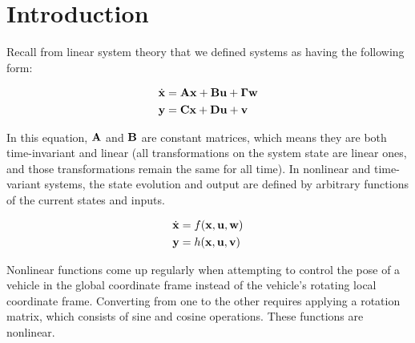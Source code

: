 \section{Introduction}

Recall from linear \gls{system} theory that we defined \glspl{system} as having
the following form:

\begin{align*}
  \dot{\mathbf{x}} &= \mathbf{A}\mathbf{x} + \mathbf{B}\mathbf{u} + \mathbf{\Gamma}\mathbf{w} \\
  \mathbf{y} &= \mathbf{C}\mathbf{x} + \mathbf{D}\mathbf{u} + \mathbf{v}
\end{align*}

In this equation, $\mathbf{A}$ and $\mathbf{B}$ are constant matrices, which means
they are both time-invariant and linear (all transformations on the \gls{system}
\gls{state} are linear ones, and those transformations remain the same for all
time). In nonlinear and time-variant \glspl{system}, the \gls{state} evolution
and \gls{output} are defined by arbitrary functions of the current \glspl{state}
and \glspl{input}.

\begin{align*}
  \dot{\mathbf{x}} &= f(\mathbf{x}, \mathbf{u}, \mathbf{w}) \\
  \mathbf{y} &= h(\mathbf{x}, \mathbf{u}, \mathbf{v})
\end{align*}

Nonlinear functions come up regularly when attempting to control the \gls{pose}
of a vehicle in the global coordinate frame instead of the vehicle's rotating
local coordinate frame. Converting from one to the other requires applying a
rotation matrix, which consists of sine and cosine operations. These functions
are nonlinear.
